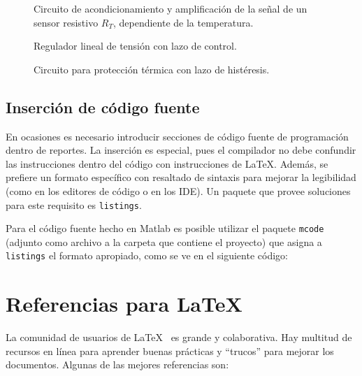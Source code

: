 \begin{figure}
\centering

\caption[Circuito de acondicionamiento y amplificación]{Circuito de acondicionamiento y amplificación de la señal de un sensor resistivo $R_T$, dependiente de la temperatura.}
\label{F:acondicionamiento}
\end{figure}

\begin{figure}
\centering

\caption{Regulador lineal de tensión con lazo de control.}
\label{F:reguladorlineal}
\end{figure}

\begin{figure}
\centering

\caption{Circuito para protección térmica con lazo de histéresis.}
\label{F:protecciontermica}
\end{figure}

\subsection{Inserción de código fuente}

En ocasiones es necesario introducir secciones de código fuente de programación dentro de reportes. La inserción es especial, pues el compilador no debe confundir las instrucciones dentro del código con instrucciones de \LaTeX. Además, se prefiere un formato específico con resaltado de sintaxis para mejorar la legibilidad (como en los editores de código o en los IDE). Un paquete que provee soluciones para este requisito es \texttt{listings}.

Para el código fuente hecho en Matlab es posible utilizar el paquete \texttt{mcode} (adjunto como archivo a la carpeta que contiene el proyecto) que asigna a \texttt{listings} el formato apropiado, como se ve en el siguiente código:



\section{Referencias para \LaTeX}

La comunidad de usuarios de \LaTeX~ es grande y colaborativa. Hay multitud de recursos en línea para aprender buenas prácticas y ``trucos'' para mejorar los documentos. Algunas de las mejores referencias son:

